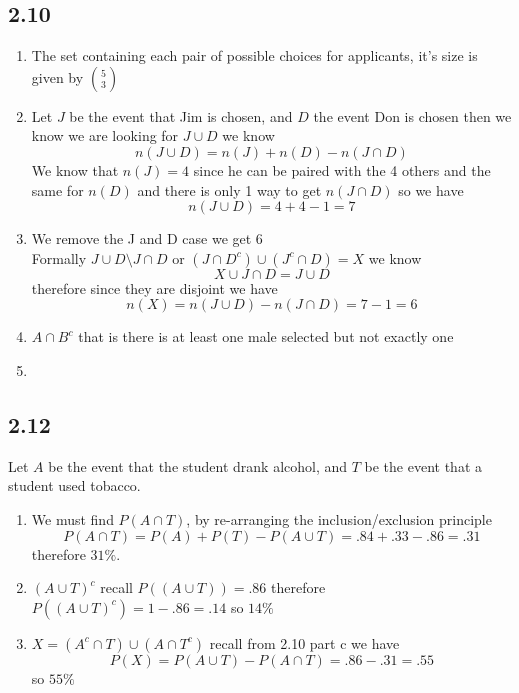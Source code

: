\documentclass[11pt]{book}
\begin{document}

\subsection{2.10}%
\label{sub:2_10}

\begin{enumerate}[label=\alph*)]
    \item The set containing each pair of possible choices for applicants, it's size is given by $\binom{5}{3} $ 
    \item Let $J$ be the event that Jim is chosen, and $D$  the event Don is chosen then we know we are looking for $J\cup D$ we know 
        \[
        n\left(J\cup D\right) = n\left(J\right)  + n\left(D\right)  - n\left(J\cap D\right) 
        \]
        We know that $n\left(J\right) = 4$ since he can be paired with the 4 others and the same for $n\left(D\right) $ and there is only 1 way to get $n\left(J\cap D\right) $ so we have 
        \[
        n\left(J\cup D\right) = 4 + 4  - 1 = 7
        \]
        
    \item We remove the J and D case we get 6\\
    Formally $J\cup D \setminus J\cap D$ or $\left( J\cap D^{c}  \right) \cup \left( J^{c} \cap D \right) = X $ we know 
        \[
        X \cup J\cap D= J\cup D
        \]
        therefore since they are disjoint we have 
        \[
        n\left(X\right) = n\left(J\cup D\right)  - n\left(J\cap D\right) = 7  - 1 = 6
        \]
    \item $A \cap B^{c} $ that is there is at least one male selected but not exactly one
    \item {} 
\end{enumerate}


\subsection{2.12}%
\label{sub:2_12}

Let $A$ be the event that the student drank alcohol, and $T$ be the event that a student used tobacco.  
\begin{enumerate}[label=\alph*)]
    \item We must find $P\left(A\cap T\right) $, by re-arranging the inclusion/exclusion principle
        \[
        P\left(A\cap T\right) = P\left(A\right)  + P\left(T\right)  - P\left(A\cup T\right) = .84  + .33  - .86 = .31
        \]
        therefore $31\%$.
    \item $\left( A\cup T \right) ^{c} $ recall $P\left(\left( A\cup T \right) \right) = .86$ therefore $P\left(\left( A\cup T \right) ^{c} \right) = 1  - .86= .14$ so $14\%$ 
    \item $X = \left( A^{c} \cap T \right) \cup \left( A \cap T^{c}  \right) $ recall from 2.10 part c we have
        \[
        P\left(X\right) = P\left(A\cup T\right)  - P\left(A\cap T\right) = .86  - .31 = .55
        \]
        so $55\%$ 
\end{enumerate}
\end{document}
